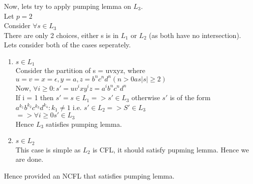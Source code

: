 \documentclass{article}
\begin{document}
Now, lets try to apply pumping lemma on $L_3$.\\
Let $p = 2$\\
Consider $\forall s \in L_3$\\
There are only 2 choices, either s is in $L_1$ or $L_2$ (as both have no intersection). Lets consider both of the cases seperately.\\
\begin{enumerate}
    \item $s \in L_1$\\
    Consider the partition of s = uvxyz, where $u = v = x = \epsilon, y = a, z = b^nc^nd^n (n > 0 as |s| \geq 2)$ \\
    Now, $\forall i \geq 0 : s' = uv^ixy^iz = a^ib^nc^nd^n$\\
    If i = 1 then $s'=s \in L_1 => s' \in L_3$ otherwise $s' $ is of the form  $a^{k_1}b^{k_2}c^{k_3}d^{k_4} : k_1 \neq 1$ i.e. $s' \in L_2 => S' \in L_3$\\
    $=> \forall i \geq 0 s' \in L_3$\\
    Hence $L_3$  satisfies pumping lemma.
    \item $s \in L_2$ \\
    This case is simple as $L_2$ is CFL, it should satisfy pupming lemma. Hence we are done.
\end{enumerate}
Hence provided an NCFL that satisfies pumping lemma.
\pagebreak
\end{document}
